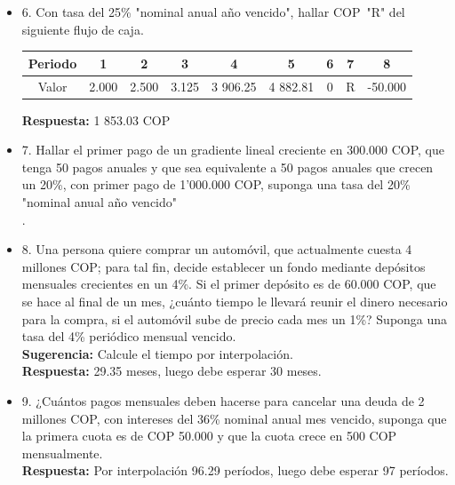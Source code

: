 \begin{itemize}
 \item 6. Con tasa del 25\% "nominal anual año vencido", hallar  COP\  "R" del siguiente flujo de caja.
      \begin{center}
            \begin{tabular}{|c|c|c|c|c|c|c|c|c|}
            \hline
            Periodo & 1 & 2 & 3 & 4 & 5 & 6 & 7 & 8 \\ \hline
            Valor & 2.000 & 2.500 & 3.125 & 3 906.25 & 4 882.81 & 0 & R & -50.000 \\ \hline
            \end{tabular}
      \end{center}
       \textbf{Respuesta:}  1 853.03 COP\\
       \medskip

 \item 7. Hallar el primer pago de un gradiente lineal creciente en  300.000 COP, que tenga 50 pagos anuales y que sea equivalente a 50 pagos anuales que crecen un 20\%, con primer pago de  1'000.000 COP, suponga una tasa del 20\% "nominal anual año vencido"\\.
       \medskip

 \item 8. Una persona quiere comprar un automóvil, que actualmente cuesta  4 millones COP; para tal fin, decide establecer un fondo mediante depósitos mensuales crecientes en un 4\%. Si el primer depósito es de  60.000 COP, que se hace al final de un mes, ¿cuánto tiempo le llevará reunir el dinero necesario para la compra, si el automóvil sube de precio cada mes un 1\%? Suponga una tasa del 4\% periódico mensual vencido.\\
       \textbf{Sugerencia:} Calcule el tiempo por interpolación.\\
       \textbf{Respuesta:} 29.35 meses, luego debe esperar 30 meses.\\
       \medskip

 \item 9. ¿Cuántos pagos mensuales deben hacerse para cancelar una deuda de  2 millones COP, con intereses del 36\% nominal anual mes vencido, suponga que la primera cuota es de COP 50.000 y que la cuota crece en  500 COP mensualmente.\\
       \textbf{Respuesta:} Por interpolación 96.29 períodos, luego debe esperar 97 períodos.\\
       \medskip


\end{itemize}
